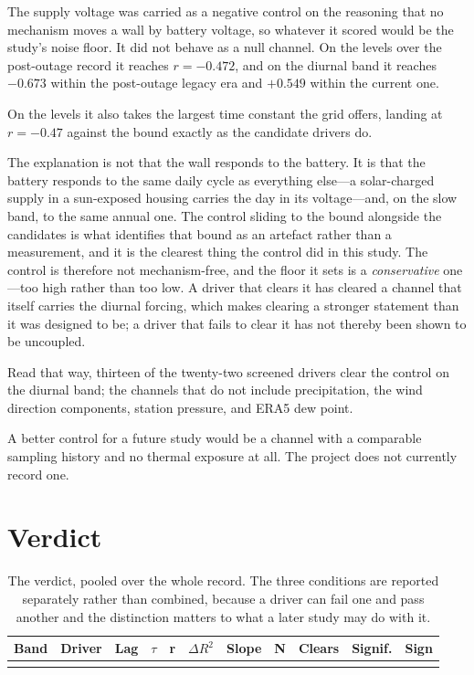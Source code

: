 \documentclass[11pt,a4paper]{article}
\begin{document}
The supply voltage was carried as a negative control on the reasoning that no
mechanism moves a wall by battery voltage, so whatever it scored would be the
study's noise floor. It did not behave as a null channel. On the levels over the
post-outage record it reaches $r = -0.472$, and on the diurnal band it reaches
$-0.673$ within the post-outage legacy era and $+0.549$ within the current one.

On the levels it also takes the largest time constant the grid offers, landing
at $r = -0.47$ against the bound exactly as the candidate drivers do.

The explanation is not that the wall responds to the battery. It is that the
battery responds to the same daily cycle as everything else---a solar-charged
supply in a sun-exposed housing carries the day in its voltage---and, on the
slow band, to the same annual one. The control sliding to the bound alongside
the candidates is what identifies that bound as an artefact rather than a
measurement, and it is the clearest thing the control did in this study. The control is
therefore not mechanism-free, and the floor it sets is a \emph{conservative}
one---too high rather than too low. A driver that clears it has cleared a
channel that itself carries the diurnal forcing, which makes clearing a stronger
statement than it was designed to be; a driver that fails to clear it has not
thereby been shown to be uncoupled.

Read that way, thirteen of the twenty-two screened drivers clear the control on
the diurnal band; the channels that do not include precipitation, the wind
direction components, station pressure, and ERA5 dew point.

A better control for a future study would be a channel with a comparable
sampling history and no thermal exposure at all. The project does not currently
record one.

\section{Verdict}
\label{sec:verdict}

\begin{table}[H]
\centering
\small
\begin{tabular}{llrrrrrrlll}
\toprule
\textbf{Band} & \textbf{Driver} & \textbf{Lag} & \textbf{$\tau$} &
\textbf{r} & \textbf{$\Delta R^2$} & \textbf{Slope} & \textbf{N} &
\textbf{Clears} & \textbf{Signif.} & \textbf{Sign} \\
\midrule
\\
\bottomrule
\end{tabular}
\caption{The verdict, pooled over the whole record. The three conditions are
reported separately rather than combined, because a driver can fail one and pass
another and the distinction matters to what a later study may do with it.}
\label{tab:verdict}
\end{table}
\end{document}
